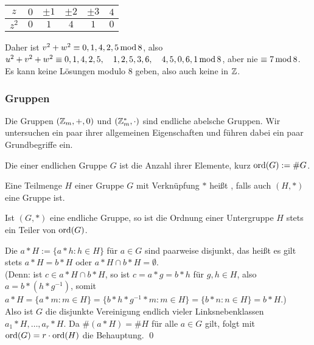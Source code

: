 \begin{itemize}
		\begin{center}
			\begin{tabular}{c||c|c|c|c|c}
			$z$ & $0$ & $\pm 1$ & $\pm 2$ & $\pm 3$ & $4$ \\ 
			\hline $z^2$ & $0$ & $1$ & $4$ & $1$ & $0$ \\ 
			\end{tabular} 
		\end{center}
		Daher ist $v^2 + w^2 \equiv 0,1,4,2,5 \operatorname{mod} 8$, also $u^2+v^2+w^2 \equiv 0,1,4,2,5, \quad 1,2,5,3,6, \quad 4,5,0,6,1 \operatorname{mod} 8$, aber nie $\equiv 7 \operatorname{mod} 8$. Es kann keine Lösungen modulo $8$ geben, also auch keine in $\mathbb{Z}$.
	\end{itemize}

\nextlecture
\subsubsection{Gruppen}
\label{subsub:1.1.3}
	Die Gruppen $(\mathbb{Z}_m,+,0)$ und $(\mathbb{Z}_m^*,\cdot)$ sind endliche abelsche Gruppen.\marginnote{[4]} Wir untersuchen ein paar ihrer allgemeinen Eigenschaften und führen dabei ein paar Grundbegriffe ein.
	
\begin{defn}[Gruppenordnung]
	Die  einer endlichen Gruppe $G$ ist die Anzahl ihrer Elemente, kurz $\operatorname{ord}(G) := \#G$.
\end{defn}

\begin{defn}[Untergruppe]
	Eine Teilmenge $H$ einer Gruppe $G$ mit Verknüpfung $*$ heißt , falls auch $(H,*)$ eine Gruppe ist.
\end{defn}

\begin{satz}
\label{satz_lagrange}
	Ist $(G,*)$ eine endliche Gruppe, so ist die Ordnung einer Untergruppe $H$ stets ein Teiler von $\operatorname{ord}(G)$. 
\end{satz}

	Die  $a*H := \{ a * h : h \in H\}$ für $a \in G$ sind paarweise disjunkt, das heißt es gilt stets $a * H = b * H$ oder $a * H \cap b * H = \emptyset$. \\
	(Denn: ist $c \in a * H \cap b * H$, so ist $c = a * g = b * h$ für $g,h \in H$, also $a = b * (h * g^{-1})$, somit $a*H = \{a * m : m \in H\} = \{b * h * g^{-1} * m : m \in H\} = \{b * n : n \in H\} = b * H$.) \\
	Also ist $G$ die disjunkte Vereinigung endlich vieler Linksnebenklassen $a_1 * H, \dots, a_r * H$. Da $\#(a*H) = \#H$ für alle $a \in G$ gilt, folgt mit $\operatorname{ord}(G) = r \cdot \operatorname{ord}(H)$ die Behauptung. \qed
	
